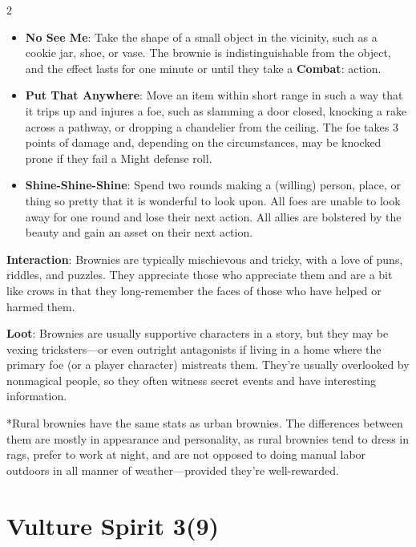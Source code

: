 \begin{multicols}{2}
\begin{itemize}
\item \textbf{No See Me}: Take the shape of a small object in the vicinity, such as a cookie jar, shoe, or vase. The brownie is indistinguishable from the object, and the effect lasts for one minute or until they take a \textbf{Combat}: action. 

\item \textbf{Put That Anywhere}: Move an item within short range in such a way that it trips up and injures a foe, such as slamming a door closed, knocking a rake across a pathway, or dropping a chandelier from the ceiling. The foe takes 3 points of damage and, depending on the circumstances, may be knocked prone if they fail a Might defense roll. 

\item \textbf{Shine-Shine-Shine}: Spend two rounds making a (willing) person, place, or thing so pretty that it is wonderful to look upon. All foes are unable to look away for one round and lose their next action. All allies are bolstered by the beauty and gain an asset on their next action. 
\end{itemize}

\textbf{Interaction}: Brownies are typically mischievous and tricky, with a love of puns, riddles, and puzzles. They appreciate those who appreciate them and are a bit like crows in that they long-remember the faces of those who have helped or harmed them. 

\textbf{Loot}: Brownies are usually supportive characters in a story, but they may be vexing tricksters—or even outright antagonists if living in a home where the primary foe (or a player character) mistreats them. They’re usually overlooked by nonmagical people, so they often witness secret events and have interesting information.

*Rural brownies have the same stats as urban brownies. The differences between them are mostly in appearance and personality, as rural brownies tend to dress in rags, prefer to work at night, and are not opposed to doing manual labor outdoors in all manner of weather—provided they’re well-rewarded.

\section{Vulture Spirit 3(9)}


\end{multicols}
